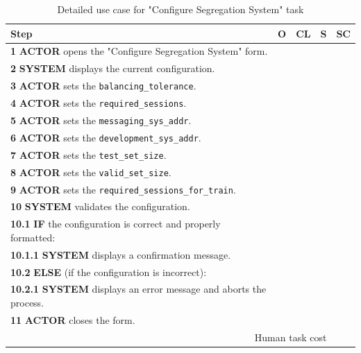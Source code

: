 \begin{table}[H]
    \centering
    \begin{tabularx}{\textwidth}{|X|c|c|c|c|}
    
    \hline
    \textbf{Step} & \textbf{O} & \textbf{CL} & \textbf{S} & \textbf{SC} \\
    \hline
    \textbf{1} \textbf{ACTOR} opens the "Configure Segregation System" form. & & & & \\
    \hline
    \textbf{2} \textbf{SYSTEM} displays the current configuration.& & & & \\ 
    \hline
    \textbf{3} \textbf{ACTOR} sets the \texttt{balancing\_tolerance}.& & & & \\
    \hline
    \textbf{4} \textbf{ACTOR} sets the \texttt{required\_sessions}. & & & & \\
    \hline
    \textbf{5} \textbf{ACTOR} sets the \texttt{messaging\_sys\_addr}.& & & & \\ 
    \hline
    \textbf{6} \textbf{ACTOR} sets the \texttt{development\_sys\_addr}.& & & & \\ 
    \hline
    \textbf{7} \textbf{ACTOR} sets the \texttt{test\_set\_size}.& & & & \\ 
    \hline
    \textbf{8} \textbf{ACTOR} sets the \texttt{valid\_set\_size}.& & & & \\ 
    \hline
    \textbf{9} \textbf{ACTOR} sets the \texttt{required\_sessions\_for\_train}.& & & & \\ 
    \hline
    \textbf{10} \textbf{SYSTEM} validates the configuration.& & & & \\
    \hline
    \textbf{10.1} \textbf{IF} the configuration is correct and properly formatted:& & & & \\ 
    \hline
    \textbf{10.1.1} \textbf{SYSTEM} displays a confirmation message.& & & & \\ 
    \hline
    \textbf{10.2} \textbf{ELSE} (if the configuration is incorrect):& & & & \\
    \hline
    \textbf{10.2.1} \textbf{SYSTEM} displays an error message and aborts the process.& & & & \\
    \hline
    \textbf{11} \textbf{ACTOR} closes the form.& & & & \\
    \hline
    \multicolumn{4}{|r|}{Human task cost} & \\
    \hline
    \end{tabularx}
    \caption{Detailed use case for "Configure Segregation System" task}
    \label{table:configure_segregation_system}
    \end{table}

